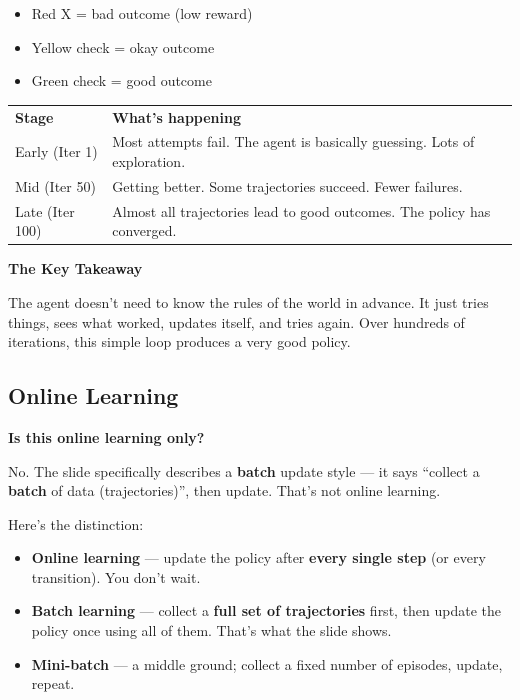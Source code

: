 \begin{itemize}
    \item Red X = bad outcome (low reward)
    \item Yellow check = okay outcome
    \item Green check = good outcome
\end{itemize}

\begin{tabular}{ll}
\textbf{Stage} & \textbf{What's happening} \\[4pt]
Early (Iter 1) & Most attempts fail. The agent is basically guessing. Lots of exploration. \\
Mid (Iter 50) & Getting better. Some trajectories succeed. Fewer failures. \\
Late (Iter 100) & Almost all trajectories lead to good outcomes. The policy has converged. \\
\end{tabular}

\medskip

\textbf{The Key Takeaway}

The agent doesn't need to know the rules of the world in advance. It just tries things, sees what worked, updates itself, and tries again. Over hundreds of iterations, this simple loop produces a very good policy.


\subsection{Online Learning}

\textbf{Is this online learning only?}

No. The slide specifically describes a \textbf{batch} update style --- it says ``collect a \textbf{batch} of data (trajectories)'', then update. That's not online learning.

Here's the distinction:

\begin{itemize}
    \item \textbf{Online learning} --- update the policy after \textbf{every single step} (or every transition). You don't wait.
    \item \textbf{Batch learning} --- collect a \textbf{full set of trajectories} first, then update the policy once using all of them. That's what the slide shows.
    \item \textbf{Mini-batch} --- a middle ground; collect a fixed number of episodes, update, repeat.
\end{itemize}

